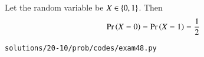 Let the random variable be $X\in \left\{0,1\right\}$.  Then
\begin{align}
\Pr\left(X=0\right)=\Pr\left(X=1\right)=\frac{1}{2}
\end{align}
\begin{lstlisting}
solutions/20-10/prob/codes/exam48.py
\end{lstlisting}
